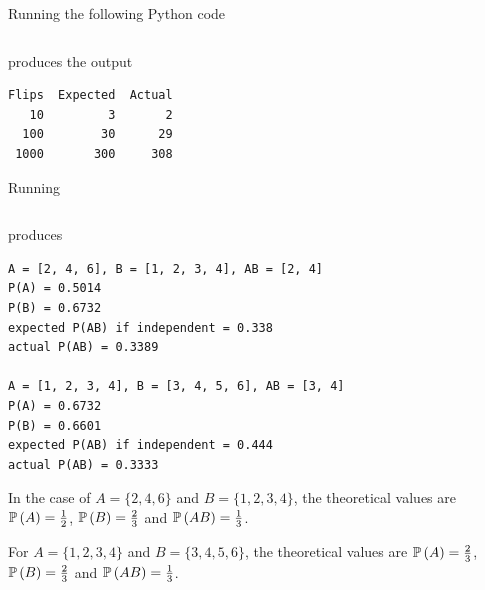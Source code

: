 \begin{ex}
  Running the following Python code
  \inputminted{python}{src/01-22.py}
  produces the output
  \begin{verbatim}
Flips  Expected  Actual
   10         3       2
  100        30      29
 1000       300     308
  \end{verbatim}
\end{ex}

\begin{ex}
  Running
  \inputminted{python}{src/01-23.py}
  produces
  \begin{verbatim}
A = [2, 4, 6], B = [1, 2, 3, 4], AB = [2, 4]
P(A) = 0.5014
P(B) = 0.6732
expected P(AB) if independent = 0.338
actual P(AB) = 0.3389

A = [1, 2, 3, 4], B = [3, 4, 5, 6], AB = [3, 4]
P(A) = 0.6732
P(B) = 0.6601
expected P(AB) if independent = 0.444
actual P(AB) = 0.3333
\end{verbatim}

  In the case of $A=\{2, 4, 6\}$ and $B=\{1, 2, 3, 4\}$, the theoretical values
  are $\P{A}=\frac{1}{2}$, $\P{B}=\frac{2}{3}$ and $\P{AB}=\frac{1}{3}$.

  For $A=\{1, 2, 3, 4\}$ and $B=\{3, 4, 5, 6\}$, the theoretical values are
  $\P{A}=\frac{2}{3}$, $\P{B}=\frac{2}{3}$ and $\P{AB}=\frac{1}{3}$.
\end{ex}